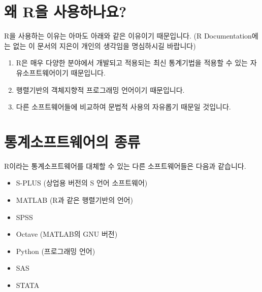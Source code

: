 \documentclass[tutorial.tex]{subfiles}
\begin{document}



\section{왜 R을 사용하나요?}

R을 사용하는 이유는 아마도 아래와 같은 이유이기 때문입니다. 
(R Documentation에는 없는 이 문서의 지은이 개인의 생각임을 명심하시길 바랍니다)

\begin{enumerate}
	\item R은 매우 다양한 분야에서 개발되고 적용되는 최신 통계기법을 적용할 수 있는 자유소프트웨어이기 때문입니다.
	\item 행렬기반의 객체지향적 프로그래밍 언어이기 때문입니다.
	\item 다른 소프트웨어들에 비교하여 문법적 사용의 자유롭기 때문일 것입니다.
\end{enumerate}


\section{통계소프트웨어의 종류}

R이라는 통계소프트웨어를 대체할 수 있는 다른 소프트웨어들은 다음과 같습니다. 

\begin{itemize}
\item S-PLUS (상업용 버전의 S 언어 소프트웨어)
\item MATLAB (R과 같은 행렬기반의 언어)
\item SPSS
\item Octave (MATLAB의 GNU 버전)
\item Python (프로그래밍 언어)
\item SAS
\item STATA
\end{itemize}
\end{document}

